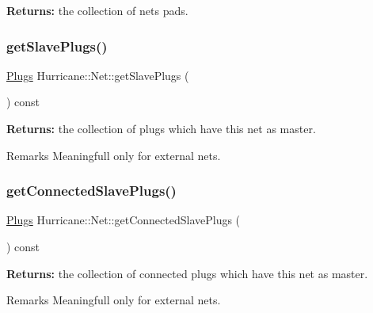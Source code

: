 {\bfseries Returns\+:} the collection of net\textquotesingle{}s pads. \mbox{\label{classHurricane_1_1Net_a9c835d2f071155521700921d816ac1fa}} 
\subsubsection{\texorpdfstring{get\+Slave\+Plugs()}{getSlavePlugs()}}
{\footnotesize\ttfamily \mbox{\hyperlink{namespaceHurricane_ac8335d2057483ee7a935c15a9460c64f}{Plugs}} Hurricane\+::\+Net\+::get\+Slave\+Plugs (\begin{DoxyParamCaption}{ }\end{DoxyParamCaption}) const}

{\bfseries Returns\+:} the collection of plugs which have this net as master.

\begin{DoxyRemark}{Remarks}
Meaningfull only for external nets. 
\end{DoxyRemark}
\mbox{\label{classHurricane_1_1Net_a08560ffa6b0f5ecc442bf232486dd8ff}} 
\subsubsection{\texorpdfstring{get\+Connected\+Slave\+Plugs()}{getConnectedSlavePlugs()}}
{\footnotesize\ttfamily \mbox{\hyperlink{namespaceHurricane_ac8335d2057483ee7a935c15a9460c64f}{Plugs}} Hurricane\+::\+Net\+::get\+Connected\+Slave\+Plugs (\begin{DoxyParamCaption}{ }\end{DoxyParamCaption}) const}

{\bfseries Returns\+:} the collection of connected plugs which have this net as master.

\begin{DoxyRemark}{Remarks}
Meaningfull only for external nets. 
\end{DoxyRemark}
\mbox{\label{classHurricane_1_1Net_aad3f3ea88bdea914cab3f38bdcdb843d}} 
